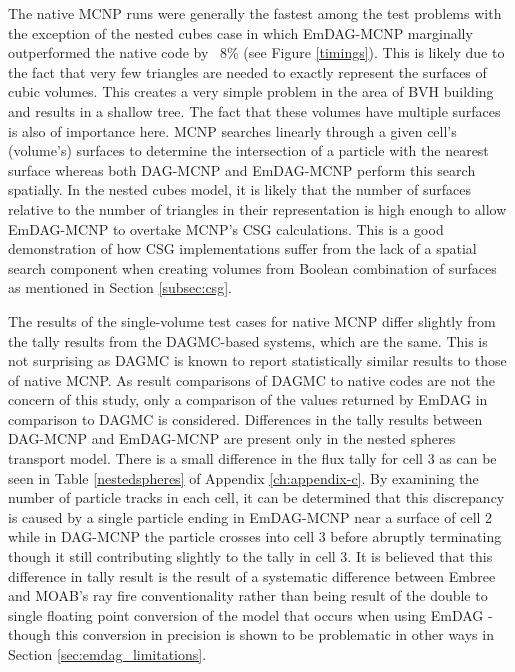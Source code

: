 The native MCNP runs were generally the fastest among the test problems with the
exception of the nested cubes case in which EmDAG-MCNP marginally outperformed
the native code by ~8\% (see Figure \ref{timings}). This is likely due to the
fact that very few triangles are needed to exactly represent the surfaces of
cubic volumes. This creates a very simple problem in the area of BVH building
and results in a shallow tree. The fact that these volumes have multiple
surfaces is also of importance here. MCNP searches linearly through a given
cell's (volume's) surfaces to determine the intersection of a particle with the
nearest surface whereas both DAG-MCNP and EmDAG-MCNP perform this search
spatially. In the nested cubes model, it is likely that the number of surfaces
relative to the number of triangles in their representation is high enough to
allow EmDAG-MCNP to overtake MCNP's CSG calculations. This is a good
demonstration of how CSG implementations suffer from the lack of a spatial
search component when creating volumes from Boolean combination of surfaces as
mentioned in Section \ref{subsec:csg}.

The results of the single-volume test cases for native MCNP differ slightly from
the tally results from the DAGMC-based systems, which are the same. This is not
surprising as DAGMC is known to report statistically similar results to those of
native MCNP. As result comparisons of DAGMC to native codes are not the concern
of this study, only a comparison of the values returned by EmDAG in comparison
to DAGMC is considered. Differences in the tally results between DAG-MCNP and
EmDAG-MCNP are present only in the nested spheres transport model. There is a
small difference in the flux tally for cell 3 as can be seen in Table
\ref{nestedspheres} of Appendix \ref{ch:appendix-c}. By examining the number of
particle tracks in each cell, it can be determined that this discrepancy is
caused by a single particle ending in EmDAG-MCNP near a surface of cell 2 while
in DAG-MCNP the particle crosses into cell 3 before abruptly terminating though
it still contributing slightly to the tally in cell 3. It is believed that this
difference in tally result is the result of a systematic difference between
Embree and MOAB's ray fire conventionality rather than being result of the
double to single floating point conversion of the model that occurs when using
EmDAG - though this conversion in precision is shown to be problematic in other
ways in Section \ref{sec:emdag_limitations}.

